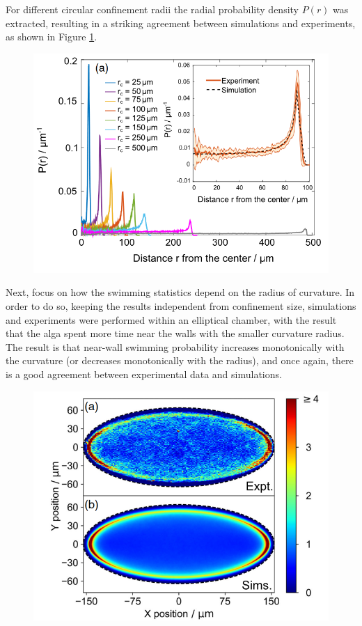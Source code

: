 \documentclass[../../master_thesis_np.tex]{subfiles}
\begin{document}
	For different circular confinement radii the radial probability density $P(r)$ was extracted, resulting in a striking agreement between simulations and experiments, as shown in Figure \ref{fig:ostapenko1}.
	\begin{figure}[htp]
		\centering
		\includegraphics[width=\singfigwidth]{ostapenko1.png}
		\caption{\parencite{ostapenko_curvature-guided_2018}}
		\label{fig:ostapenko1}
	\end{figure}
	
	Next, \citeauthor{ostapenko_curvature-guided_2018} focus on how the swimming statistics depend on the radius of curvature. In order to do so, keeping the results independent from confinement size, simulations and experiments were performed within an elliptical chamber, with the result that the alga spent more time near the walls with the smaller curvature radius. The result is that near-wall swimming probability increases monotonically with the curvature (or decreases monotonically with the radius), and once again, there is a good agreement between experimental data and simulations.
	\begin{figure}[htp]
		\centering
		\includegraphics[width=\singfigwidth]{ostapenko2.png}
		\caption{\parencite{ostapenko_curvature-guided_2018}}
		\label{fig:ostapenko2}
	\end{figure}
	
\end{document}
